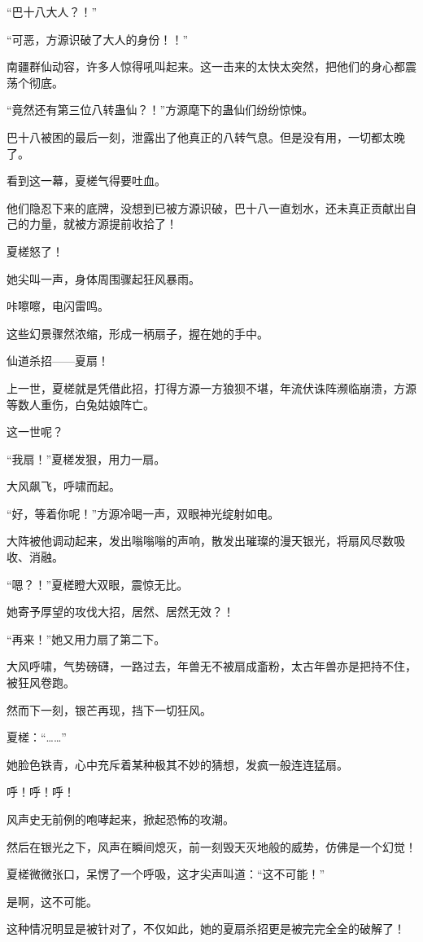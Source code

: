 \begin{this_body}
“巴十八大人？！”

“可恶，方源识破了大人的身份！！”

南疆群仙动容，许多人惊得吼叫起来。这一击来的太快太突然，把他们的身心都震荡个彻底。

“竟然还有第三位八转蛊仙？！”方源麾下的蛊仙们纷纷惊悚。

巴十八被困的最后一刻，泄露出了他真正的八转气息。但是没有用，一切都太晚了。

看到这一幕，夏槎气得要吐血。

他们隐忍下来的底牌，没想到已被方源识破，巴十八一直划水，还未真正贡献出自己的力量，就被方源提前收拾了！

夏槎怒了！

她尖叫一声，身体周围骤起狂风暴雨。

咔嚓嚓，电闪雷鸣。

这些幻景骤然浓缩，形成一柄扇子，握在她的手中。

仙道杀招——夏扇！

上一世，夏槎就是凭借此招，打得方源一方狼狈不堪，年流伏诛阵濒临崩溃，方源等数人重伤，白兔姑娘阵亡。

这一世呢？

“我扇！”夏槎发狠，用力一扇。

大风飙飞，呼啸而起。

“好，等着你呢！”方源冷喝一声，双眼神光绽射如电。

大阵被他调动起来，发出嗡嗡嗡的声响，散发出璀璨的漫天银光，将扇风尽数吸收、消融。

“嗯？！”夏槎瞪大双眼，震惊无比。

她寄予厚望的攻伐大招，居然、居然无效？！

“再来！”她又用力扇了第二下。

大风呼啸，气势磅礴，一路过去，年兽无不被扇成齑粉，太古年兽亦是把持不住，被狂风卷跑。

然而下一刻，银芒再现，挡下一切狂风。

夏槎：“……”

她脸色铁青，心中充斥着某种极其不妙的猜想，发疯一般连连猛扇。

呼！呼！呼！

风声史无前例的咆哮起来，掀起恐怖的攻潮。

然后在银光之下，风声在瞬间熄灭，前一刻毁天灭地般的威势，仿佛是一个幻觉！

夏槎微微张口，呆愣了一个呼吸，这才尖声叫道：“这不可能！”

是啊，这不可能。

这种情况明显是被针对了，不仅如此，她的夏扇杀招更是被完完全全的破解了！


\end{this_body}
